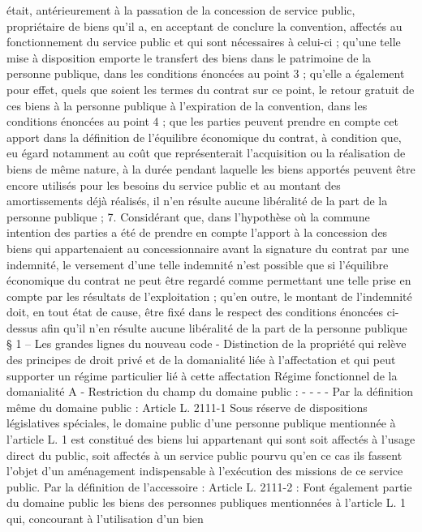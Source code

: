 \documentclass[11pt,a4paper]{report}
\begin{document}
était, antérieurement à la passation de la concession de service public, propriétaire de biens qu'il
a, en acceptant de conclure la convention, affectés au fonctionnement du service public et qui sont
nécessaires à celui-ci ; qu'une telle mise à disposition emporte le transfert des biens dans le
patrimoine de la personne publique, dans les conditions énoncées au point 3 ; qu'elle a également
pour effet, quels que soient les termes du contrat sur ce point, le retour gratuit de ces biens à la
personne publique à l'expiration de la convention, dans les conditions énoncées au point 4 ; que les
parties peuvent prendre en compte cet apport dans la définition de l'équilibre économique du
contrat, à condition que, eu égard notamment au coût que représenterait l'acquisition ou la
réalisation de biens de même nature, à la durée pendant laquelle les biens apportés peuvent être
encore utilisés pour les besoins du service public et au montant des amortissements déjà réalisés, il
n'en résulte aucune libéralité de la part de la personne publique ;
7. Considérant que, dans l'hypothèse où la commune intention des parties a été de prendre en
compte l'apport à la concession des biens qui appartenaient au concessionnaire avant la signature
du contrat par une indemnité, le versement d'une telle indemnité n'est possible que si l'équilibre
économique du contrat ne peut être regardé comme permettant une telle prise en compte par les
résultats de l'exploitation ; qu'en outre, le montant de l'indemnité doit, en tout état de cause, être
fixé dans le respect des conditions énoncées ci-dessus afin qu'il n'en résulte aucune libéralité de la
part de la personne publique
§ 1 – Les grandes lignes du nouveau code
- Distinction de la propriété qui relève des principes de droit privé et de la domanialité liée à l’affectation et qui
peut supporter un régime particulier lié à cette affectation
Régime fonctionnel de la domanialité
A - Restriction du champ du domaine public :
-
-
-
-
Par la définition même du domaine public : Article L. 2111-1
Sous réserve de dispositions législatives spéciales, le domaine public d'une personne publique
mentionnée à l'article L. 1 est constitué des biens lui appartenant qui sont soit affectés à l'usage
direct du public, soit affectés à un service public pourvu qu'en ce cas ils fassent l'objet d'un
aménagement indispensable à l'exécution des missions de ce service public.
Par la définition de l’accessoire : Article L. 2111-2 : Font également partie du domaine public les
biens des personnes publiques mentionnées à l'article L. 1 qui, concourant à l'utilisation d'un bien
\end{document}
